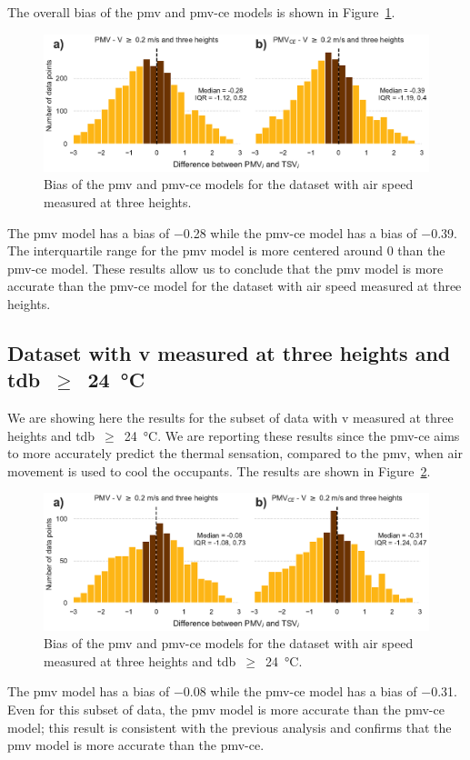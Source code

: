 The overall bias of the \ac{pmv} and \ac{pmv-ce} models is shown in Figure~\ref{fig:hist_discrepancies_three_heights}.
\begin{figure}[htb!]
    \centering
    \includegraphics[width=\textwidth]{figures/hist_discrepancies_three_heights}
    \caption{Bias of the \ac{pmv} and \ac{pmv-ce} models for the dataset with air speed measured at three heights.}
    \label{fig:hist_discrepancies_three_heights}
\end{figure}
The \ac{pmv} model has a bias of \num{-.28} while the \ac{pmv-ce} model has a bias of \num{-.39}.
The interquartile range for the \ac{pmv} model is more centered around \num{0} than the \ac{pmv-ce} model.
These results allow us to conclude that the \ac{pmv} model is more accurate than the \ac{pmv-ce} model for the dataset with air speed measured at three heights.

\subsection{Dataset with \ac{v} measured at three heights and \ac{tdb}~$\geq$~\qty{24}{\celsius}}\label{subsec:dataset-with-v-measured-at-three-heights-and-tdb-geq-24-celsius}
We are showing here the results for the subset of data with \ac{v} measured at three heights and \ac{tdb}~$\geq$~\qty{24}{\celsius}.
We are reporting these results since the \ac{pmv-ce} aims to more accurately predict the thermal sensation, compared to the \ac{pmv}, when air movement is used to cool the occupants.
The results are shown in Figure~\ref{fig:hist_discrepancies_three_heights_limit_t}.
\begin{figure}[htb!]
    \centering
    \includegraphics[width=\textwidth]{figures/hist_discrepancies_three_heights_limit_t}
    \caption{Bias of the \ac{pmv} and \ac{pmv-ce} models for the dataset with air speed measured at three heights and \ac{tdb}~$\geq$~\qty{24}{\celsius}.}
    \label{fig:hist_discrepancies_three_heights_limit_t}
\end{figure}

The \ac{pmv} model has a bias of \num{-.08} while the \ac{pmv-ce} model has a bias of \num{-.31}. Even for this subset of data, the \ac{pmv} model is more accurate than the \ac{pmv-ce} model; this result is consistent with the previous analysis and confirms that the \ac{pmv} model is more accurate than the \ac{pmv-ce}.